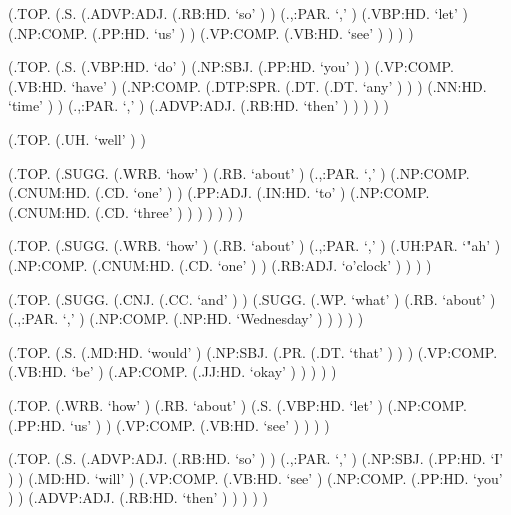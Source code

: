 \documentclass[10pt]{article}
\begin{document}
\begin{parsetree}  (.TOP. (.S. (.ADVP:ADJ. (.RB:HD. `so' ) ) (.,:PAR. `,' ) (.VBP:HD. `let' ) (.NP:COMP. (.PP:HD. `us' ) ) (.VP:COMP. (.VB:HD. `see' ) ) ) ) \end{parsetree}

\begin{parsetree}  (.TOP. (.S. (.VBP:HD. `do' ) (.NP:SBJ. (.PP:HD. `you' ) ) (.VP:COMP. (.VB:HD. `have' ) (.NP:COMP. (.DTP:SPR. (.DT. (.DT. `any' ) ) ) (.NN:HD. `time' ) ) (.,:PAR. `,' ) (.ADVP:ADJ. (.RB:HD. `then' ) ) ) ) ) \end{parsetree}

\begin{parsetree}  (.TOP. (.UH. `well' ) ) \end{parsetree}

\begin{parsetree}  (.TOP. (.SUGG. (.WRB. `how' ) (.RB. `about' ) (.,:PAR. `,' ) (.NP:COMP. (.CNUM:HD. (.CD. `one' ) ) (.PP:ADJ. (.IN:HD. `to' ) (.NP:COMP. (.CNUM:HD. (.CD. `three' ) ) ) ) ) ) ) \end{parsetree}

\begin{parsetree}  (.TOP. (.SUGG. (.WRB. `how' ) (.RB. `about' ) (.,:PAR. `,' ) (.UH:PAR. `"ah' ) (.NP:COMP. (.CNUM:HD. (.CD. `one' ) ) (.RB:ADJ. `o'clock' ) ) ) ) \end{parsetree}

\begin{parsetree}  (.TOP. (.SUGG. (.CNJ. (.CC. `and' ) ) (.SUGG. (.WP. `what' ) (.RB. `about' ) (.,:PAR. `,' ) (.NP:COMP. (.NP:HD. `Wednesday' ) ) ) ) ) \end{parsetree}

\begin{parsetree}  (.TOP. (.S. (.MD:HD. `would' ) (.NP:SBJ. (.PR. (.DT. `that' ) ) ) (.VP:COMP. (.VB:HD. `be' ) (.AP:COMP. (.JJ:HD. `okay' ) ) ) ) ) \end{parsetree}

\begin{parsetree}  (.TOP. (.WRB. `how' ) (.RB. `about' ) (.S. (.VBP:HD. `let' ) (.NP:COMP. (.PP:HD. `us' ) ) (.VP:COMP. (.VB:HD. `see' ) ) ) ) \end{parsetree}

\begin{parsetree}  (.TOP. (.S. (.ADVP:ADJ. (.RB:HD. `so' ) ) (.,:PAR. `,' ) (.NP:SBJ. (.PP:HD. `I' ) ) (.MD:HD. `will' ) (.VP:COMP. (.VB:HD. `see' ) (.NP:COMP. (.PP:HD. `you' ) ) (.ADVP:ADJ. (.RB:HD. `then' ) ) ) ) ) \end{parsetree}
\end{document}
